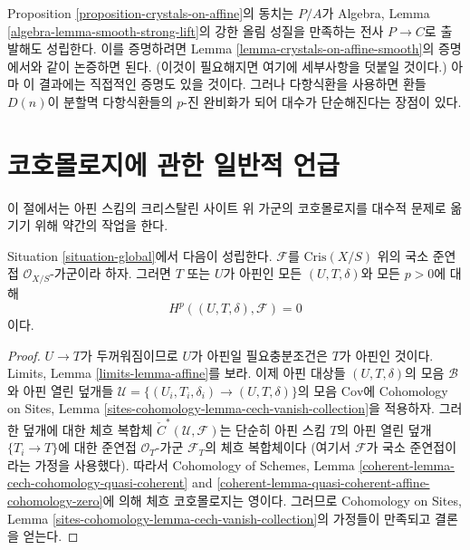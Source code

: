 \begin{remark}
\label{remark-equivalence-more-general}
Proposition \ref{proposition-crystals-on-affine}의 동치는 $P/A$가
Algebra, Lemma \ref{algebra-lemma-smooth-strong-lift}의 강한 올림
성질을 만족하는 전사 $P \to C$로 출발해도 성립한다. 이를 증명하려면
Lemma \ref{lemma-crystals-on-affine-smooth}의 증명에서와 같이 논증하면
된다. (이것이 필요해지면 여기에 세부사항을 덧붙일 것이다.)
아마 이 결과에는 직접적인 증명도 있을 것이다. 그러나 다항식환을
사용하면 환들 $D(n)$이 분할멱 다항식환들의 $p$-진 완비화가 되어
대수가 단순해진다는 장점이 있다.
\end{remark}




\section{코호몰로지에 관한 일반적 언급}
\label{section-cohomology-lqc}

\noindent
이 절에서는 아핀 스킴의 크리스탈린 사이트 위 가군의 코호몰로지를
대수적 문제로 옮기기 위해 약간의 작업을 한다.

\begin{lemma}
\label{lemma-vanishing-lqc}
Situation \ref{situation-global}에서 다음이 성립한다.
$\mathcal{F}$를 $\text{Cris}(X/S)$ 위의 국소 준연접
$\mathcal{O}_{X/S}$-가군이라 하자. 그러면 $T$ 또는 $U$가 아핀인
모든 $(U, T, \delta)$와 모든 $p > 0$에 대해
$$
H^p((U, T, \delta), \mathcal{F}) = 0
$$
이다.
\end{lemma}

\begin{proof}
$U \to T$가 두꺼워짐이므로 $U$가 아핀일 필요충분조건은 $T$가
아핀인 것이다. Limits, Lemma \ref{limits-lemma-affine}를 보라.
이제 아핀 대상들 $(U, T, \delta)$의 모음 $\mathcal{B}$와 아핀 열린
덮개들 $\mathcal{U} = \{(U_i, T_i, \delta_i) \to
(U, T, \delta)\}$의 모음 $\text{Cov}$에 Cohomology on Sites, Lemma
\ref{sites-cohomology-lemma-cech-vanish-collection}을 적용하자.
그러한 덮개에 대한 체흐 복합체
${\check C}^*(\mathcal{U}, \mathcal{F})$는 단순히 아핀 스킴 $T$의
아핀 열린 덮개 $\{T_i \to T\}$에 대한 준연접
$\mathcal{O}_T$-가군 $\mathcal{F}_T$의 체흐 복합체이다
(여기서 $\mathcal{F}$가 국소 준연접이라는 가정을 사용했다).
따라서 Cohomology of Schemes, Lemma
\ref{coherent-lemma-cech-cohomology-quasi-coherent} and
\ref{coherent-lemma-quasi-coherent-affine-cohomology-zero}에 의해
체흐 코호몰로지는 영이다. 그러므로 Cohomology on Sites, Lemma
\ref{sites-cohomology-lemma-cech-vanish-collection}의 가정들이
만족되고 결론을 얻는다.
\end{proof}

